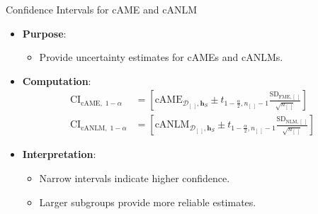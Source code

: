 \documentclass[10pt,compress,t,notes=noshow, xcolor=table]{beamer}
\newcommand{\boldhS}{\bm{h}_{S}}
\begin{document}
\begin{frame}{Confidence Intervals for cAME and cANLM}
\begin{itemize}
\item \textbf{Purpose}:
\begin{itemize}
\item Provide uncertainty estimates for cAMEs and cANLMs.
\end{itemize}
\item \textbf{Computation}:
\begin{align*}
\text{CI}_{\text{cAME}, \; 1 - \alpha} &= \left[\text{cAME}_{\mathcal{D}_{[\;]}, \boldhS} \pm t_{1-\frac{\alpha}{2}, n_{[\;]}-1} \frac{\text{SD}_{\text{FME}, [\;]}}{\sqrt{n_{[\;]}}} \right] \\
\text{CI}_{\text{cANLM}, \; 1 - \alpha} &= \left[\text{cANLM}_{\mathcal{D}_{[\;]}, \boldhS} \pm t_{1-\frac{\alpha}{2}, n_{[\;]}-1} \frac{\text{SD}_{\text{NLM}, [\;]}}{\sqrt{n_{[\;]}}} \right]
\end{align*}
\item \textbf{Interpretation}:
\begin{itemize}
\item Narrow intervals indicate higher confidence.
\item Larger subgroups provide more reliable estimates.
\end{itemize}
\end{itemize}
\end{frame}

\end{document}
